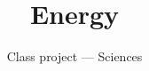 \documentclass{beamer}
\title{Energy}
\subtitle{Class project --- Sciences}
\begin{document}
\begin{frame}
\titlepage
\end{frame}
\end{document}
